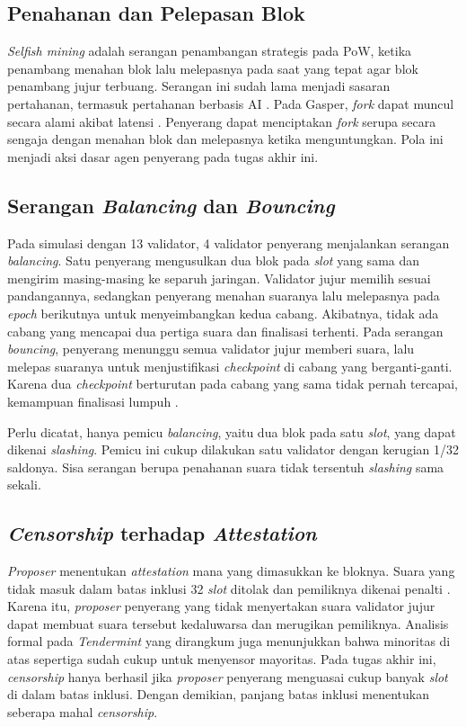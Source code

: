 \subsection{Penahanan dan Pelepasan Blok}
\textit{Selfish mining} adalah serangan penambangan strategis pada PoW, ketika penambang menahan blok lalu melepasnya pada saat yang tepat agar blok penambang jujur terbuang. Serangan ini sudah lama menjadi sasaran pertahanan, termasuk pertahanan berbasis AI \parencite{skowronski2026adaptive}. Pada Gasper, \textit{fork} dapat muncul secara alami akibat latensi \parencite{laneve2025stochastic}. Penyerang dapat menciptakan \textit{fork} serupa secara sengaja dengan menahan blok dan melepasnya ketika menguntungkan. Pola ini menjadi aksi dasar agen penyerang pada tugas akhir ini.

\subsection{Serangan \textit{Balancing} dan \textit{Bouncing}}
Pada simulasi \textcite{laneve2025stochastic} dengan 13 validator, 4 validator penyerang menjalankan serangan \textit{balancing}. Satu penyerang mengusulkan dua blok pada \textit{slot} yang sama dan mengirim masing-masing ke separuh jaringan. Validator jujur memilih sesuai pandangannya, sedangkan penyerang menahan suaranya lalu melepasnya pada \textit{epoch} berikutnya untuk menyeimbangkan kedua cabang. Akibatnya, tidak ada cabang yang mencapai dua pertiga suara dan finalisasi terhenti. Pada serangan \textit{bouncing}, penyerang menunggu semua validator jujur memberi suara, lalu melepas suaranya untuk menjustifikasi \textit{checkpoint} di cabang yang berganti-ganti. Karena dua \textit{checkpoint} berturutan pada cabang yang sama tidak pernah tercapai, kemampuan finalisasi lumpuh \parencite{laneve2025stochastic}.

Perlu dicatat, hanya pemicu \textit{balancing}, yaitu dua blok pada satu \textit{slot}, yang dapat dikenai \textit{slashing}. Pemicu ini cukup dilakukan satu validator dengan kerugian 1/32 saldonya. Sisa serangan berupa penahanan suara tidak tersentuh \textit{slashing} sama sekali.

\subsection{\textit{Censorship} terhadap \textit{Attestation}}
\textit{Proposer} menentukan \textit{attestation} mana yang dimasukkan ke bloknya. Suara yang tidak masuk dalam batas inklusi 32 \textit{slot} ditolak dan pemiliknya dikenai penalti \parencite{laneve2025stochastic}. Karena itu, \textit{proposer} penyerang yang tidak menyertakan suara validator jujur dapat membuat suara tersebut kedaluwarsa dan merugikan pemiliknya. Analisis formal pada \textit{Tendermint} yang dirangkum \textcite{laneve2025stochastic} juga menunjukkan bahwa minoritas di atas sepertiga sudah cukup untuk menyensor mayoritas. Pada tugas akhir ini, \textit{censorship} hanya berhasil jika \textit{proposer} penyerang menguasai cukup banyak \textit{slot} di dalam batas inklusi. Dengan demikian, panjang batas inklusi menentukan seberapa mahal \textit{censorship}.

